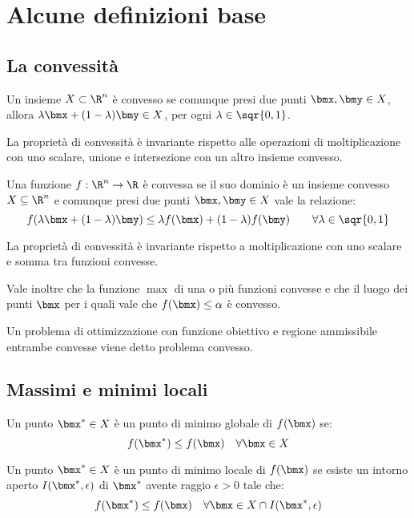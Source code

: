 \documentclass[\main/main.tex]{subfiles}
\begin{document}
\chapter{Alcune definizioni base}
\section{La convessità}
\begin{definition}
    Un insieme \(X \subset \R^n\) è convesso se comunque presi due punti \(\bmx,\bmy \in X\), allora \(\lambda\bmx + (1-\lambda)\bmy \in X\), per ogni \(\lambda \in \sqr{0,1}\).

    La proprietà di convessità è invariante rispetto alle operazioni di moltiplicazione con uno scalare, unione e intersezione con un altro insieme convesso.
\end{definition}
\begin{definition}
    Una funzione \(f: \R^n \rightarrow \R \) è convessa se il suo dominio è un insieme convesso \(X \subseteq \R^n\) e comunque presi due punti \(\bmx, \bmy \in X\) vale la relazione:
    \[
        f(\lambda\bmx + (1-\lambda)\bmy) \leq \lambda f(\bmx) + (1-\lambda)f(\bmy) \qquad \forall \lambda \in \sqr{0,1}
    \]

    La proprietà di convessità è invariante rispetto a moltiplicazione con uno scalare e somma tra funzioni convesse.

    Vale inoltre che la funzione \(\max \) di una o più funzioni convesse e che il luogo dei punti \(\bmx \) per i quali vale che \(f(\bmx) \leq \alpha \) è convesso.
\end{definition}
\begin{definition}
    Un problema di ottimizzazione con funzione obiettivo e regione ammissibile entrambe convesse viene detto problema convesso.
\end{definition}
\section{Massimi e minimi locali}
\begin{definition}
    Un punto \(\bmx^* \in X\) è un punto di minimo globale di \(f(\bmx)\) se:
    \[
        f(\bmx^*) \leq f(\bmx) \quad \forall \bmx \in X
    \]
\end{definition}
\begin{definition}
    Un punto \(\bmx^* \in X\) è un punto di minimo locale di \(f(\bmx)\) se esiste un intorno aperto \(I(\bmx^*, \epsilon)\) di \(\bmx^*\) avente raggio \(\epsilon >0\) tale che:
    \[
        f(\bmx^*) \leq f(\bmx) \quad \forall \bmx \in X \cap I(\bmx^*, \epsilon)
    \]
\end{definition}
\end{document}
